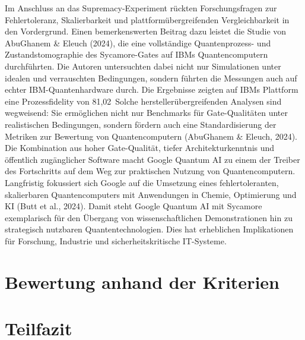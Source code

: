 Im Anschluss an das Supremacy-Experiment rückten Forschungsfragen zur Fehlertoleranz, Skalierbarkeit und plattformübergreifenden Vergleichbarkeit in den Vordergrund. Einen bemerkenswerten Beitrag dazu leistet die Studie von AbuGhanem & Eleuch (2024), die eine vollständige Quantenprozess- und Zustandstomographie des Sycamore-Gates auf IBMs Quantencomputern durchführten. Die Autoren untersuchten dabei nicht nur Simulationen unter idealen und verrauschten Bedingungen, sondern führten die Messungen auch auf echter IBM-Quantenhardware durch. Die Ergebnisse zeigten auf IBMs Plattform eine Prozessfidelity von 81,02 %
Solche herstellerübergreifenden Analysen sind wegweisend: Sie ermöglichen nicht nur Benchmarks für Gate-Qualitäten unter realistischen Bedingungen, sondern fördern auch eine Standardisierung der Metriken zur Bewertung von Quantencomputern (AbuGhanem & Eleuch, 2024). Die Kombination aus hoher Gate-Qualität, tiefer Architekturkenntnis und öffentlich zugänglicher Software macht Google Quantum AI zu einem der Treiber des Fortschritts auf dem Weg zur praktischen Nutzung von Quantencomputern. Langfristig fokussiert sich Google auf die Umsetzung eines fehlertoleranten, skalierbaren Quantencomputers mit Anwendungen in Chemie, Optimierung und KI (Butt et al., 2024).
Damit steht Google Quantum AI mit Sycamore exemplarisch für den Übergang von wissenschaftlichen Demonstrationen hin zu strategisch nutzbaren Quantentechnologien. Dies hat erheblichen Implikationen für Forschung, Industrie und sicherheitskritische IT-Systeme.


\section{Bewertung anhand der Kriterien}
\section{Teilfazit}


\printbibliography
